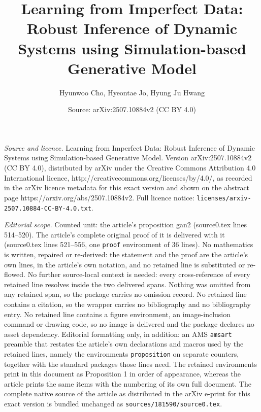 \documentclass[10pt,a4paper]{amsart}
\title{Learning from Imperfect Data: Robust Inference of Dynamic Systems using Simulation-based Generative Model}
\author{Hyunwoo Cho, Hyeontae Jo, Hyung Ju Hwang}
\date{Source: arXiv:2507.10884v2 (CC BY 4.0)}
\begin{document}
\maketitle

\noindent\emph{Source and licence.} Learning from Imperfect Data: Robust Inference of Dynamic Systems using Simulation-based Generative Model. Version arXiv:2507.10884v2 (CC BY 4.0), distributed by arXiv under the Creative Commons Attribution 4.0 International licence, http://creativecommons.org/licenses/by/4.0/, as recorded in the arXiv licence metadata for this exact version and shown on the abstract page https://arxiv.org/abs/2507.10884v2. Full licence notice: \texttt{licenses/arxiv-2507.10884-CC-BY-4.0.txt}.\par\smallskip

\noindent\textit{Editorial scope.} Counted unit: the article's proposition gan2 (source0.tex lines 514--520). The article's complete original proof of it is delivered with it (source0.tex lines 521--556, one \texttt{proof} environment of 36 lines). No mathematics is written, repaired or re-derived: the statement and the proof are the article's own lines, in the article's own notation, and no retained line is substituted or re-flowed.  No further source-local context is needed: every cross-reference of every retained line resolves inside the two delivered spans.  Nothing was omitted from any retained span, so the package carries no omission record.  No retained line contains a citation, so the wrapper carries no bibliography and no bibliography entry.  No retained line contains a figure environment, an image-inclusion command or drawing code, so no image is delivered and the package declares no asset dependency.  Editorial formatting only, in addition: an AMS \texttt{amsart} preamble that restates the article's own declarations and macros used by the retained lines, namely the environments \texttt{proposition} on separate counters, together with the standard packages those lines need.  The retained environments print in this document as Proposition 1 in order of appearance, whereas the article prints the same items with the numbering of its own full document.  The complete native source of the article as distributed in the arXiv e-print for this exact version is bundled unchanged as \texttt{sources/181590/source0.tex}.
\end{document}
